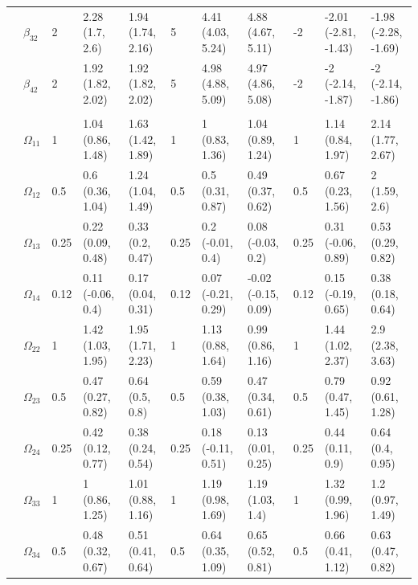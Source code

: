 \documentclass{article}
\begin{document}
\begin{landscape}
\begin{table}[t]
\begin{tabular}{lllllllllll}
\hspace{1em} & $\beta_{32}$ & 2 & 2.28 (1.7, 2.6) & 1.94 (1.74, 2.16) & 5 & 4.41 (4.03, 5.24) & 4.88 (4.67, 5.11) & -2 & -2.01 (-2.81, -1.43) & -1.98 (-2.28, -1.69)\\
\hspace{1em} & $\beta_{42}$ & 2 & 1.92 (1.82, 2.02) & 1.92 (1.82, 2.02) & 5 & 4.98 (4.88, 5.09) & 4.97 (4.86, 5.08) & -2 & -2 (-2.14, -1.87) & -2 (-2.14, -1.86)\\
\addlinespace[0.3em]
\multicolumn{11}{l}{\textbf{ }}\\
\hspace{1em} & $\Omega_{11}$ & 1 & 1.04 (0.86, 1.48) & 1.63 (1.42, 1.89) & 1 & 1 (0.83, 1.36) & 1.04 (0.89, 1.24) & 1 & 1.14 (0.84, 1.97) & 2.14 (1.77, 2.67)\\
\hspace{1em} & $\Omega_{12}$ & 0.5 & 0.6 (0.36, 1.04) & 1.24 (1.04, 1.49) & 0.5 & 0.5 (0.31, 0.87) & 0.49 (0.37, 0.62) & 0.5 & 0.67 (0.23, 1.56) & 2 (1.59, 2.6)\\
\hspace{1em} & $\Omega_{13}$ & 0.25 & 0.22 (0.09, 0.48) & 0.33 (0.2, 0.47) & 0.25 & 0.2 (-0.01, 0.4) & 0.08 (-0.03, 0.2) & 0.25 & 0.31 (-0.06, 0.89) & 0.53 (0.29, 0.82)\\
\hspace{1em} & $\Omega_{14}$ & 0.12 & 0.11 (-0.06, 0.4) & 0.17 (0.04, 0.31) & 0.12 & 0.07 (-0.21, 0.29) & -0.02 (-0.15, 0.09) & 0.12 & 0.15 (-0.19, 0.65) & 0.38 (0.18, 0.64)\\
\hspace{1em} & $\Omega_{22}$ & 1 & 1.42 (1.03, 1.95) & 1.95 (1.71, 2.23) & 1 & 1.13 (0.88, 1.64) & 0.99 (0.86, 1.16) & 1 & 1.44 (1.02, 2.37) & 2.9 (2.38, 3.63)\\
\hspace{1em} & $\Omega_{23}$ & 0.5 & 0.47 (0.27, 0.82) & 0.64 (0.5, 0.8) & 0.5 & 0.59 (0.38, 1.03) & 0.47 (0.34, 0.61) & 0.5 & 0.79 (0.47, 1.45) & 0.92 (0.61, 1.28)\\
\hspace{1em} & $\Omega_{24}$ & 0.25 & 0.42 (0.12, 0.77) & 0.38 (0.24, 0.54) & 0.25 & 0.18 (-0.11, 0.51) & 0.13 (0.01, 0.25) & 0.25 & 0.44 (0.11, 0.9) & 0.64 (0.4, 0.95)\\
\hspace{1em} & $\Omega_{33}$ & 1 & 1 (0.86, 1.25) & 1.01 (0.88, 1.16) & 1 & 1.19 (0.98, 1.69) & 1.19 (1.03, 1.4) & 1 & 1.32 (0.99, 1.96) & 1.2 (0.97, 1.49)\\
\hspace{1em} & $\Omega_{34}$ & 0.5 & 0.48 (0.32, 0.67) & 0.51 (0.41, 0.64) & 0.5 & 0.64 (0.35, 1.09) & 0.65 (0.52, 0.81) & 0.5 & 0.66 (0.41, 1.12) & 0.63 (0.47, 0.82)\\

\end{tabular}
\end{table}
\end{landscape}
\end{document}
